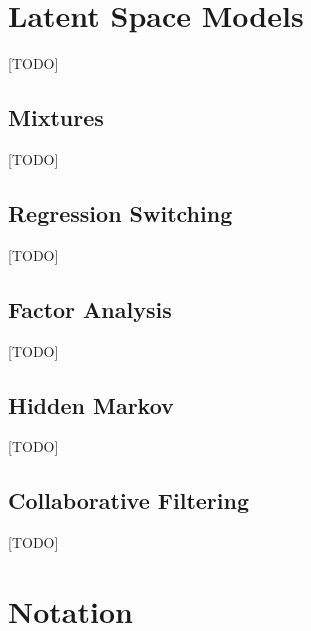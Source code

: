 \section{Latent Space Models}
\label{sec:latent_space}
[TODO]


\subsection{Mixtures}
[TODO]


\subsection{Regression Switching}
[TODO]



\subsection{Factor Analysis}
[TODO]


\subsection{Hidden Markov}
[TODO]


\subsection{Collaborative Filtering}
[TODO]





\newpage

\appendix



\section{Notation}
\label{sec:notation}


